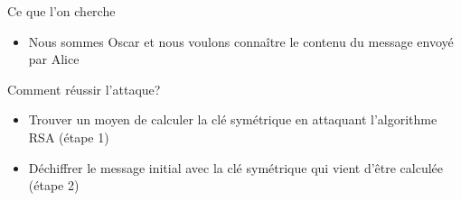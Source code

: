 \documentclass{beamer}
\begin{document}
	\begin{frame}
	\begin{block}{Ce que l'on cherche}
		\begin{itemize}
		\item Nous sommes Oscar et nous voulons connaître le contenu du message envoyé par Alice
		\end{itemize}
	\end{block}
	\begin{block}{Comment réussir l'attaque?}
		\begin{itemize}
		\item Trouver un moyen de calculer la clé symétrique en attaquant l'algorithme RSA (étape 1)
		\item Déchiffrer le message initial avec la clé symétrique qui vient d'être calculée (étape 2)
		\end{itemize}
	\end{block}
    \end{frame}
	
\end{document}
